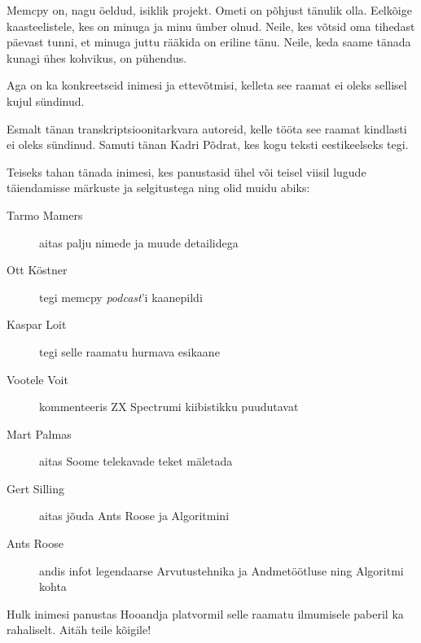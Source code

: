 Memcpy on, nagu öeldud, isiklik projekt. Ometi on põhjust tänulik olla. 
Eelkõige kaasteelistele, kes on minuga ja minu ümber olnud. Neile, kes võtsid 
oma tihedast päevast tunni, et minuga juttu rääkida on eriline tänu. Neile, keda saame tänada
kunagi ühes kohvikus, on pühendus.

Aga on ka konkreetseid inimesi ja ettevõtmisi, kelleta see raamat ei oleks sellisel kujul sündinud. 

Esmalt tänan transkriptsioonitarkvara autoreid, kelle tööta see raamat kindlasti ei oleks sündinud. Samuti tänan Kadri Põdrat, kes kogu teksti eestikeelseks tegi. 

Teiseks tahan tänada inimesi, kes panustasid ühel või teisel viisil lugude täiendamisse märkuste ja selgitustega ning olid muidu abiks:

\begin{description}
	\item[Tarmo Mamers] aitas palju nimede ja muude detailidega
	\item[Ott Köstner] tegi memcpy \emph{podcast}'i kaanepildi
	\item[Kaspar Loit] tegi selle raamatu hurmava esikaane
	\item[Vootele Voit] kommenteeris 
 ZX Spectrumi kiibistikku puudutavat
	\item[Mart Palmas] aitas Soome telekavade teket mäletada 
	\item[Gert Silling] aitas jõuda Ants Roose ja Algoritmini 
	\item[Ants Roose] andis infot legendaarse Arvutustehnika ja Andmetöötluse ning Algoritmi kohta 
\end{description}

Hulk inimesi panustas Hooandja platvormil selle raamatu ilmumisele paberil ka rahaliselt. Aitäh teile kõigile!

